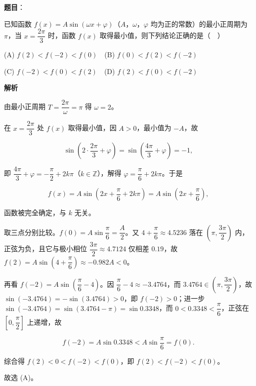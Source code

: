 \begin{answer}

\end{answer}
\begin{answer}

\textbf{题目}：

已知函数 \(f(x)=A\sin(\omega x+\varphi)\)（\(A\)，\(\omega\)，\(\varphi\) 均为正的常数）的最小正周期为 \(\pi\)，当 \(x=\dfrac{2\pi}{3}\) 时，函数 \(f(x)\) 取得最小值，则下列结论正确的是（　）

(A) \(f(2)<f(-2)<f(0)\)　(B) \(f(0)<f(2)<f(-2)\)

(C) \(f(-2)<f(0)<f(2)\)　(D) \(f(2)<f(0)<f(-2)\)

\textbf{解析}

由最小正周期 \(T=\dfrac{2\pi}{\omega}=\pi\) 得 \(\omega=2\)。

在 \(x=\dfrac{2\pi}{3}\) 处 \(f(x)\) 取得最小值，因 \(A>0\)，最小值为 \(-A\)，故

\nopagebreak[4]
\[ \sin\left(2\cdot\dfrac{2\pi}{3}+\varphi\right)=\sin\left(\dfrac{4\pi}{3}+\varphi\right)=-1, \]

即 \(\dfrac{4\pi}{3}+\varphi=-\dfrac{\pi}{2}+2k\pi\)（\(k\in\mathbb{Z}\)），解得 \(\varphi=\dfrac{\pi}{6}+2k\pi\)。于是

\nopagebreak[4]
\[ f(x)=A\sin\left(2x+\dfrac{\pi}{6}+2k\pi\right)=A\sin\left(2x+\dfrac{\pi}{6}\right), \]

函数被完全确定，与 \(k\) 无关。

取三点分别比较。\(f(0)=A\sin\dfrac{\pi}{6}=\dfrac{A}{2}\)。又 \(4+\dfrac{\pi}{6}\approx4.5236\) 落在 \(\left(\pi,\dfrac{3\pi}{2}\right)\) 内，正弦为负，且它与极小相位 \(\dfrac{3\pi}{2}\approx4.7124\) 仅相差 \(0.19\)，故 \(f(2)=A\sin\left(4+\dfrac{\pi}{6}\right)\approx-0.982A<0\)。

再看 \(f(-2)=A\sin\left(\dfrac{\pi}{6}-4\right)\)。因 \(\dfrac{\pi}{6}-4\approx-3.4764\)，而 \(3.4764\in\left(\pi,\dfrac{3\pi}{2}\right)\)，故 \(\sin(-3.4764)=-\sin(3.4764)>0\)，即 \(f(-2)>0\)；进一步 \(\sin(-3.4764)=\sin(3.4764-\pi)=\sin0.3348\)，而 \(0<0.3348<\dfrac{\pi}{6}\)，正弦在 \(\left[0,\dfrac{\pi}{2}\right]\) 上递增，故

\nopagebreak[4]
\[ f(-2)=A\sin0.3348<A\sin\dfrac{\pi}{6}=f(0). \]

综合得 \(f(2)<0<f(-2)<f(0)\)，即 \(f(2)<f(-2)<f(0)\)。

故选 (A)。


\end{answer}
